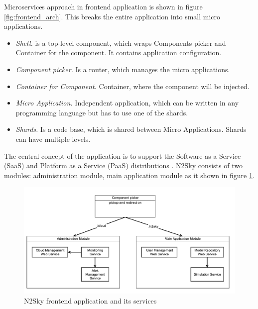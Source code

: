 Microservices approach in frontend application is shown in figure \ref{fig:frontend_arch}. This breaks the entire application into small micro applications.

\begin{itemize}
\item \emph{Shell.}  is a top-level component, which wraps Components picker and Container for the component. It contains application configuration.
\item \emph{Component picker.} Is a router, which manages the micro applications. 
\item \emph{Container for Component.} Container, where the component will be injected.
\item \emph{Micro Application.} Independent application, which can be written in any programming language but has to use one of the shards.
\item \emph{Shards.} Is a code base, which is shared between Micro Applications. Shards can have multiple levels. 
\end{itemize}
 

The central concept of the application is to support the Software as a Service (SaaS) and Platform as a Service (PaaS) distributions \cite{Walraven2014}.  N2Sky consists of two modules: administration module, main application module as it shown in figure \ref{fig:modular_design}.

\begin{figure}[H]
\begin{center}
  \includegraphics[width=\linewidth]{components/2/redirector.png}
  \caption{N2Sky frontend application and its services}
  \label{fig:modular_design}
\end{center}
\end{figure}

